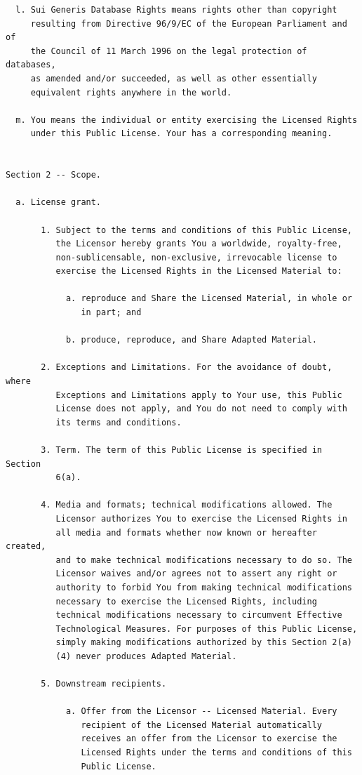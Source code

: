 \documentclass[12pt,spanish,]{article}
\begin{document}
\begin{verbatim}
  l. Sui Generis Database Rights means rights other than copyright
     resulting from Directive 96/9/EC of the European Parliament and of
     the Council of 11 March 1996 on the legal protection of databases,
     as amended and/or succeeded, as well as other essentially
     equivalent rights anywhere in the world.

  m. You means the individual or entity exercising the Licensed Rights
     under this Public License. Your has a corresponding meaning.


Section 2 -- Scope.

  a. License grant.

       1. Subject to the terms and conditions of this Public License,
          the Licensor hereby grants You a worldwide, royalty-free,
          non-sublicensable, non-exclusive, irrevocable license to
          exercise the Licensed Rights in the Licensed Material to:

            a. reproduce and Share the Licensed Material, in whole or
               in part; and

            b. produce, reproduce, and Share Adapted Material.

       2. Exceptions and Limitations. For the avoidance of doubt, where
          Exceptions and Limitations apply to Your use, this Public
          License does not apply, and You do not need to comply with
          its terms and conditions.

       3. Term. The term of this Public License is specified in Section
          6(a).

       4. Media and formats; technical modifications allowed. The
          Licensor authorizes You to exercise the Licensed Rights in
          all media and formats whether now known or hereafter created,
          and to make technical modifications necessary to do so. The
          Licensor waives and/or agrees not to assert any right or
          authority to forbid You from making technical modifications
          necessary to exercise the Licensed Rights, including
          technical modifications necessary to circumvent Effective
          Technological Measures. For purposes of this Public License,
          simply making modifications authorized by this Section 2(a)
          (4) never produces Adapted Material.

       5. Downstream recipients.

            a. Offer from the Licensor -- Licensed Material. Every
               recipient of the Licensed Material automatically
               receives an offer from the Licensor to exercise the
               Licensed Rights under the terms and conditions of this
               Public License.


\end{verbatim}
\end{document}
